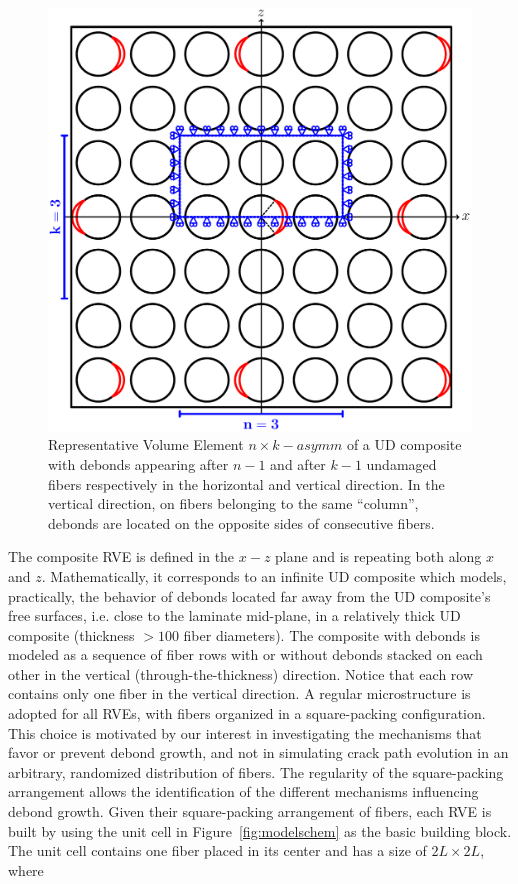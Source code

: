 \documentclass[smallextended]{svjour3}       %
\begin{document}
\begin{figure}[!h]
\centering
\includegraphics[width=\textwidth]{asymm.pdf}
\caption{Representative Volume Element $n\times k-asymm$  of a UD composite with debonds appearing after $n-1$ and after $k-1$ undamaged fibers respectively in the horizontal and vertical direction. In the vertical direction, on fibers belonging to the same ``column'', debonds are located on the opposite sides of consecutive fibers.}\label{fig:laminateModelsB}
\end{figure}

The composite RVE is defined in the $x-z$ plane and is repeating both along $x$ and $z$. Mathematically, it corresponds to an infinite UD composite which models, practically, the behavior of debonds located far away from the UD composite's free surfaces, i.e. close to the laminate mid-plane, in a relatively thick UD composite (thickness $>100$ fiber diameters). The composite with debonds is modeled as a sequence of fiber rows with or without debonds stacked on each other in the vertical (through-the-thickness) direction. Notice that each row contains only one fiber in the vertical direction. A regular microstructure is adopted for all RVEs, with fibers organized in a square-packing configuration. This choice is motivated by our interest in investigating the mechanisms that favor or prevent debond growth, and not in simulating crack path evolution in an arbitrary, randomized distribution of fibers. The regularity of the square-packing arrangement allows the identification of the different mechanisms influencing debond growth. Given their square-packing arrangement of fibers, each RVE is built by using the unit cell in Figure~\ref{fig:modelschem} as the basic building block. The unit cell contains one fiber placed in its center and has a size of $2L\times2L$, where
\end{document}
